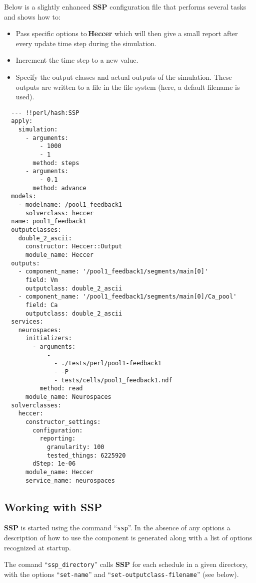 \documentclass[12pt]{article}
\begin{document}
Below is a slightly enhanced {\bf SSP} configuration file that performs several tasks and shows how to:

\begin{itemize}
\item Pass specific options to\,{\bf Heccer} which will then give a small report after every update time step during the simulation.
\item Increment the time step to a new value. 
\item Specify the output classes and actual outputs of the simulation. These outputs are written to a file in the file system (here, a default filename is used).
\end{itemize}

\begin{verbatim}
  --- !!perl/hash:SSP
  apply:
    simulation:
      - arguments:
          - 1000
          - 1
        method: steps
      - arguments:
          - 0.1
        method: advance
  models:
    - modelname: /pool1_feedback1
      solverclass: heccer
  name: pool1_feedback1
  outputclasses:
    double_2_ascii:
      constructor: Heccer::Output
      module_name: Heccer
  outputs:
    - component_name: '/pool1_feedback1/segments/main[0]'
      field: Vm
      outputclass: double_2_ascii
    - component_name: '/pool1_feedback1/segments/main[0]/Ca_pool'
      field: Ca
      outputclass: double_2_ascii
  services:
    neurospaces:
      initializers:
        - arguments:
            -
              - ./tests/perl/pool1-feedback1
              - -P
              - tests/cells/pool1_feedback1.ndf
          method: read
      module_name: Neurospaces
  solverclasses:
    heccer:
      constructor_settings:
        configuration:
          reporting:
            granularity: 100
            tested_things: 6225920
        dStep: 1e-06
      module_name: Heccer
      service_name: neurospaces
\end{verbatim}

\subsection*{Working with SSP}

{\bf SSP} is started using the command ``{\tt ssp}''. In the absence of any options a description of how to use the component is generated along with a list of options recognized at startup.

The comand ``{\tt ssp\_directory}'' calls {\bf SSP} for each schedule in a given directory, with the options ``{\tt set-name}'' and ``{\tt set-outputclass-filename}'' (see below).
\end{document}
